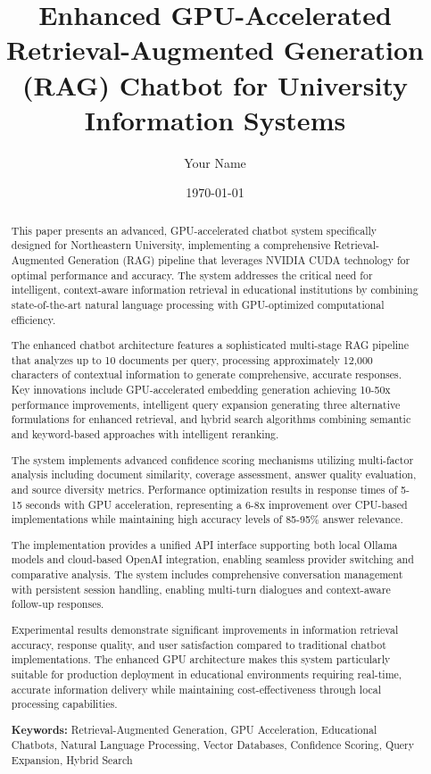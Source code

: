 \documentclass[12pt,a4paper]{article}
\title{\textbf{Enhanced GPU-Accelerated Retrieval-Augmented Generation (RAG) Chatbot for University Information Systems}}
\author{Your Name}
\date{\today}
\begin{document}
\maketitle

\begin{abstract}
This paper presents an advanced, GPU-accelerated chatbot system specifically designed for Northeastern University, implementing a comprehensive Retrieval-Augmented Generation (RAG) pipeline that leverages NVIDIA CUDA technology for optimal performance and accuracy. The system addresses the critical need for intelligent, context-aware information retrieval in educational institutions by combining state-of-the-art natural language processing with GPU-optimized computational efficiency.

The enhanced chatbot architecture features a sophisticated multi-stage RAG pipeline that analyzes up to 10 documents per query, processing approximately 12,000 characters of contextual information to generate comprehensive, accurate responses. Key innovations include GPU-accelerated embedding generation achieving 10-50x performance improvements, intelligent query expansion generating three alternative formulations for enhanced retrieval, and hybrid search algorithms combining semantic and keyword-based approaches with intelligent reranking.

The system implements advanced confidence scoring mechanisms utilizing multi-factor analysis including document similarity, coverage assessment, answer quality evaluation, and source diversity metrics. Performance optimization results in response times of 5-15 seconds with GPU acceleration, representing a 6-8x improvement over CPU-based implementations while maintaining high accuracy levels of 85-95\% answer relevance.

The implementation provides a unified API interface supporting both local Ollama models and cloud-based OpenAI integration, enabling seamless provider switching and comparative analysis. The system includes comprehensive conversation management with persistent session handling, enabling multi-turn dialogues and context-aware follow-up responses.

Experimental results demonstrate significant improvements in information retrieval accuracy, response quality, and user satisfaction compared to traditional chatbot implementations. The enhanced GPU architecture makes this system particularly suitable for production deployment in educational environments requiring real-time, accurate information delivery while maintaining cost-effectiveness through local processing capabilities.

\textbf{Keywords:} Retrieval-Augmented Generation, GPU Acceleration, Educational Chatbots, Natural Language Processing, Vector Databases, Confidence Scoring, Query Expansion, Hybrid Search
\end{abstract}

\newpage
\tableofcontents
\newpage
\end{document}
